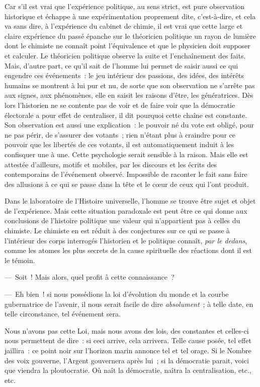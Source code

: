 \documentclass[french,twoside]{book} %
\begin{document}
Car s’il est vrai que l’expérience politique, au sens strict, est pure observation historique et échappe à une expérimentation proprement dite, c’est-à-dire, et cela va sans dire, à l’expérience du cabinet de chimie, il est vrai que cette large et claire expérience du passé épanche sur le théoricien politique un rayon de lumière dont le chimiste ne connaît point l’équivalence et que le physicien doit supposer et calculer. Le théoricien politique observe la suite et l’enchaînement des faits. Mais, d’autre part, ce qu’il sait de l’homme lui permet de saisir aussi ce qui engendre ces événements : le jeu intérieur des passions, des idées, des intérêts humains se montrent à lui pur et nu, de sorte que son observation ne s’arrête pas aux signes, aux phénomènes, elle en saisit les raisons d’être, les génératrices. Dès lors l’historien ne se contente pas de voir et de faire voir que la démocratie électorale a pour effet de centraliser, il dit pourquoi cette chaîne est constante. Son observation est aussi une explication : le pouvoir né du vote est obligé, pour ne pas périr, de s’assurer des votants ; rien n’étant plus à craindre pour ce pouvoir que les libertés de ces votants, il est automatiquement induit à les confisquer une à une. Cette psychologie serait sensible à la raison. Mais elle est attestée d’ailleurs, motifs et mobiles, par les discours et les écrits des contemporains de l’événement observé. Impossible de raconter le fait sans faire des allusions à ce qui se passe dans la tête et le cœur de ceux qui l’ont produit.\par
Dans le laboratoire de l’Histoire universelle, l’homme se trouve être sujet et objet de l’expérience. Mais cette situation paradoxale est peut être ce qui donne aux conclusions de l’histoire politique une valeur qui n’appartient pas à celles du chimiste. Le chimiste en est réduit à des conjectures sur ce qui se passe à l’intérieur des corps interrogés l’historien et le politique connaît, \emph{par le dedans}, comme les atomes les plus secrets de la cause spirituelle des réactions dont il est le témoin.\par
— Soit ! Mais alors, quel profit à cette connaissance ?\par
— Eh bien ! si nous possédions la loi d’évolution du monde et la courbe gubernatrice de l’avenir, il nous serait facile de dire \emph{absolument} ; à telle date, en telle circonstance, tel événement sera.\par
Nous n’avons pas cette Loi, mais nous avons des lois, des constantes et celles-ci nous permettent de dire : si ceci arrive, cela arrivera. Telle cause posée, tel effet jaillira : ce point noir sur l’horizon marin annonce tel et tel orage. Si le Nombre des voix gouverne, l’Argent gouvernera après lui ; si la démocratie parait, voici que viendra la ploutocratie. Où naît la démocratie, naîtra la centralisation, etc., etc.\par
\end{document}
